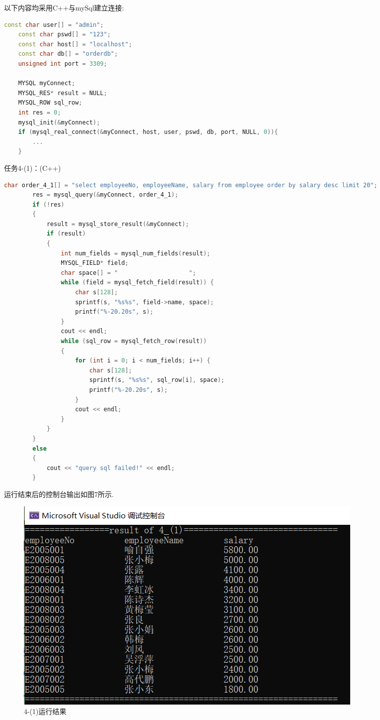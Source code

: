 \documentclass[a4paper,UTF8]{article}
\theoremstyle{definition}
\begin{document}
\begin{CJK}{UTF8}{gkai}
以下内容均采用C++与mySql建立连接:
\begin{lstlisting}[language=C++]
const char user[] = "admin";
    const char pswd[] = "123";
    const char host[] = "localhost";
    const char db[] = "orderdb";
    unsigned int port = 3309;

    MYSQL myConnect;
    MYSQL_RES* result = NULL;
    MYSQL_ROW sql_row;
    int res = 0;
    mysql_init(&myConnect);
    if (mysql_real_connect(&myConnect, host, user, pswd, db, port, NULL, 0)){
		...
	}
\end{lstlisting}
{\heiti \large 任务4-(1)：(C++)}
\begin{lstlisting}[language=C++]
char order_4_1[] = "select employeeNo, employeeName, salary from employee order by salary desc limit 20";
        res = mysql_query(&myConnect, order_4_1);
        if (!res)
        {
            result = mysql_store_result(&myConnect);
            if (result)
            {
                int num_fields = mysql_num_fields(result);
                MYSQL_FIELD* field;
                char space[] = "                    ";
                while (field = mysql_fetch_field(result)) {
                    char s[128];
                    sprintf(s, "%s%s", field->name, space);
                    printf("%-20.20s", s);
                }
                cout << endl;
                while (sql_row = mysql_fetch_row(result))
                {
                    for (int i = 0; i < num_fields; i++) {
                        char s[128];
                        sprintf(s, "%s%s", sql_row[i], space);
                        printf("%-20.20s", s);
                    }
                    cout << endl;
                }
            }
        }
        else
        {
            cout << "query sql failed!" << endl;
        }
\end{lstlisting}
\par 运行结束后的控制台输出如图7所示.
\begin{figure}[h]
\centering
\includegraphics[scale=0.8]{./img/4-1.png}
\caption{4-(1)运行结果}
\label{fig:label}
\end{figure}


\end{CJK}
\end{document}
